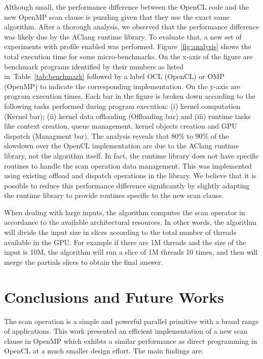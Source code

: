 \documentclass[Ingles]{ic-tese-v1}
\newcommand{\rtab}[1]{Table~\ref{tab:#1}}
\begin{document}
Although small, the performance difference between the OpenCL code and
the new OpenMP  scan clause is puzzling given that  they use the exact
same   algorithm.  After a thorough analysis, we observed that the performance
difference was likely due by  the AClang runtime library.  To evaluate
that, a  new set of  experiments with profile enabled  was performed.
Figure~\ref{fig:analysis}  shows the  total  execution  time for  some
micro-benchmarks.  On the x-axis of  the figure are benchmark programs
identified by their numbers as  listed in~\rtab{benchmark} followed by
a label  OCL (OpenCL)  or OMP (OpenMP)  to indicate  the corresponding
implementation. On the  y-axis are program execution  times.  Each bar
in  the  figure  is  broken  down according  to  the  following  tasks
performed  during program  execution: (i)  kernel computation  (Kernel
bar);  (ii) kernel  data offloading  (Offloading bar)  and (iii)  runtime
tasks like context creation, queue management, kernel objects creation
and GPU dispatch  (Managment bar).  The analysis reveals  that 80\% to
90\% of  the slowdown over  the OpenCL  implementation are due  to the
AClang  runtime  library, not  the  algorithm  itself.  In  fact,  the
runtime library  does not  have specific routines  to handle  the scan
operation  data management. This was  implemented using  existing
offload and dispatch operations in the library.  We believe that it is
possible  to  reduce  this  performance  difference  significantly  by
slightly adapting the runtime library  to provide routines specific to
the new scan clause.

When dealing with  large inputs, the algorithm computes the scan operator
in accordance to the available architectural resources. In other words,
the algorithm will divide the input size in slices according to the total number of
threads available in the GPU.  For example if there are 1M threads and the size of the input
is 10M, the algorithm will run a slice of 1M threads 10 times,  and then will
merge the partials slices to obtain the final answer.

\chapter{Conclusions and Future Works}
\label{cap:Conclusion}

The scan operation is a simple  and powerful parallel primitive with a
broad  range  of  applications.   This  work  presented  an  efficient
implementation of a new scan clause in OpenMP which exhibts
a similar performance as direct programming in OpenCL at a much
smaller design effort. The main findings are:
\end{document}
